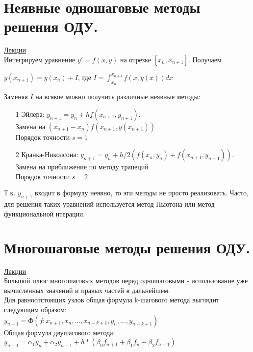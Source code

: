 \documentclass[specialist, subf, href, colorlinks=true, 12pt, times, mtpro, final]{disser}
\theoremstyle{definition}
\begin{document}
{\section {Неявные одношаговые методы решения ОДУ.}
    \hyperlink {lects.91}{Лекции}\\
    Интегрируем уравнение $y' = f (x,y)$ на отрезке $[x_n, x_{n+1}]$. Получаем
    \begin{center}
    $y(x_{n+1}) = y (x_n) + I$, где $I = \int^{x_{n+1}}_{x_n} f(x,y(x))dx$
    \end{center}
    Заменяя $I$ на всякое можно получить различные неявные методы:
    \begin{itemize}
    \item[1] Эйлера: $y_{n+1} = y_n + hf(x_{n+1}, y_{n+1})$. \\
    Замена на $(x_{n+1}-x_n)f(x_{n+1}, y(x_{n+1}))$\\
    Порядок точности $s=1$\\
    
    
    \item[2] Кранка-Николсона: $y_{n+1} = y_n + h/2(f(x_n,y_n) + f(x_{n+1}, y_{n+1}))$. \\
    Замена на приближение по методу трапеций\\
    Порядок точности $s=2$\\
    
    \end{itemize}
    
    Т.к. $y_{n+1}$ входит в формулу неявно, то эти методы не просто реализовать.  Часто, для решения таких уравнений используется метод Ньютона или метод функциональной итерации.
    

\section {Многошаговые методы решения ОДУ.}
    \hyperlink {lects.92}{Лекции}\\
    Большой плюс многошаговых методов перед одношаговыми - использование уже вычисленных значений и правых частей в дальнейшем.\\
    Для равноотстоящих узлов общая формула k-шагового метода выглядит следующим образом:\\
    $y_{n+1} = Ф(f;x_{n+1},x_n,...,x_{n-k+1},y_n,...,y_{n-k+1})$\\
    Общая формула двушагового метода:\\
    $y_{n+1} = \alpha_1y_n +\alpha_2y_{n-1} + h*(\beta_0f_{n+1} + \beta_1f_n + \beta_2f_{n-1})$\\ 
    
}
\end{document}
